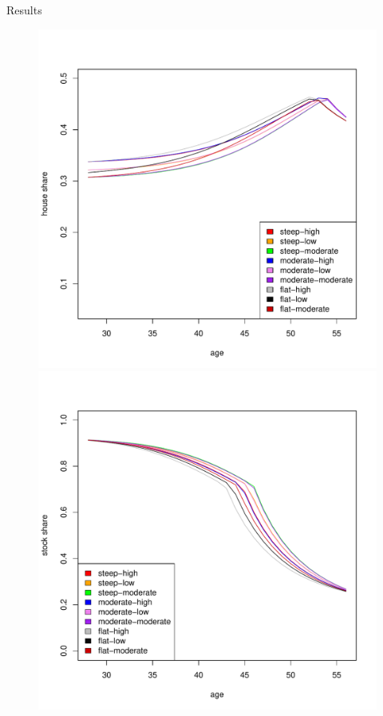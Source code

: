 \documentclass{beamer}
\begin{document}
\begin{frame}[allowframebreaks]{Results}
\begin{itemize}
\begin{figure}[H]
		\includegraphics[scale=0.25]{figs/hmunkhouse3.pdf}
		\includegraphics[scale=0.25]{figs/smunkhouse5.pdf}

\end{figure}
\end{itemize}
\end{frame}
\end{document}
